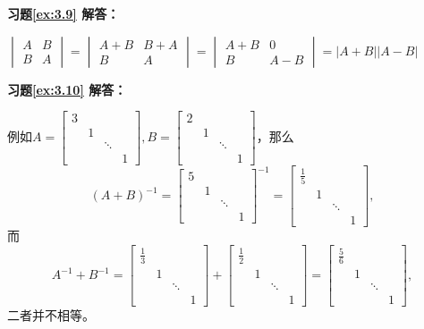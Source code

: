 \textbf{习题\ref{ex:3.9} 解答：}

$\begin{vmatrix} A & B \\ B & A \end{vmatrix} = \begin{vmatrix} A+B & B+A \\ B & A \end{vmatrix} = \begin{vmatrix} A+B & 0 \\ B & A-B \end{vmatrix} = |A + B||A - B|$

\vspace{1.5em}

\textbf{习题\ref{ex:3.10} 解答：}

例如$A = \begin{bmatrix} 3 & & & \\ & 1 & & \\ & & \ddots & \\ & & & 1 \end{bmatrix}, B = \begin{bmatrix} 2 & & & \\ & 1 & & \\ & & \ddots & \\ & & & 1 \end{bmatrix}$，那么
$$(A+B)^{-1} = \begin{bmatrix} 5 & & & \\ & 1 & & \\ & & \ddots & \\ & & & 1 \end{bmatrix}^{-1} = \begin{bmatrix} \frac15 & & & \\ & 1 & & \\ & & \ddots & \\ & & & 1 \end{bmatrix},$$
而
$$A^{-1}+B^{-1} = \begin{bmatrix} \frac13 & & & \\ & 1 & & \\ & & \ddots & \\ & & & 1 \end{bmatrix} + \begin{bmatrix} \frac12 & & & \\ & 1 & & \\ & & \ddots & \\ & & & 1 \end{bmatrix} = \begin{bmatrix} \frac56 & & & \\ & 1 & & \\ & & \ddots & \\ & & & 1 \end{bmatrix},$$
二者并不相等。

